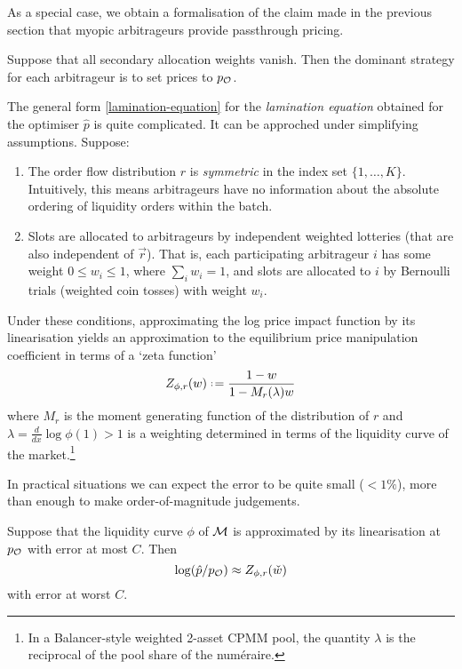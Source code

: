 As a special case, we obtain a formalisation of the claim made in the previous section that myopic arbitrageurs provide passthrough pricing.

\begin{corollary}

  Suppose that all secondary allocation weights vanish.
  Then the dominant strategy for each arbitrageur is to set prices to $p_{\mathcal{O}}$.

\end{corollary}

The general form \eqref{lamination-equation} for the \emph{lamination equation} obtained for the optimiser $\hat{p}$ is quite complicated.
%
It can be approched under simplifying assumptions. Suppose:
\begin{enumerate}
  \item 
    The order flow distribution $r$ is \emph{symmetric} in the index set $\{1,\ldots,K\}$. 
    Intuitively, this means arbitrageurs have no information about the absolute ordering of liquidity orders within the batch.
  \item 
    Slots are allocated to arbitrageurs by independent weighted lotteries (that are also independent of $\vec{r}$).
    That is, each participating arbitrageur $i$ has some weight $0\leq w_i\leq 1$, where $\sum_iw_i=1$, and slots are allocated to $i$ by Bernoulli trials (weighted coin tosses) with weight $w_i$.
\end{enumerate}
%
Under these conditions, approximating the log price impact function by its linearisation yields an approximation to the equilibrium price manipulation coefficient in terms of a `zeta function'
\[
  Z_{\phi,r}(w)\defeq \frac{1-w}{1-M_r(\lambda)w}
\]
where $M_r$ is the moment generating function of the distribution of $r$ and $\lambda=\frac{d}{dx}\log\phi(1) > 1$ is a weighting determined in terms of the liquidity curve of the market.\footnote{In a Balancer-style weighted 2-asset CPMM pool, the quantity $\lambda$ is the reciprocal of the pool share of the num\'eraire.}

\begin{remark}
  In practical situations we can expect the error to be quite small ($<1\%$), more than enough to make order-of-magnitude judgements.
\end{remark}

\begin{theorem}

  Suppose that the liquidity curve $\phi$ of $\mathcal{M}$ is approximated by its linearisation at $p_{\mathcal{O}}$ with error at most $C$.
  Then
  \[
    \log(\hat p/p_{\mathcal{O}}) \approx Z_{\phi,r}(\check w)
  \]
  with error at worst $C$.

\end{theorem}

